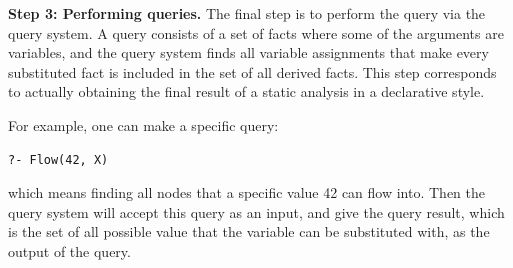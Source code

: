 \smallskip
\textbf{Step 3: Performing queries.}
The final step is to perform the query via the query system.  A query consists
of a set of facts where some of the arguments are variables, and the query system finds all variable
assignments that make every substituted fact is included in the set of all derived facts. This step corresponds
to actually obtaining the final result of a static analysis in a declarative
style. 

For example, one can make a specific query:

\begin{lstlisting}[style=mrule]
?- Flow(42, X)
\end{lstlisting}

which means finding all nodes that a specific value 42 can flow into.
Then the query system will accept this query as an input, and give
the query result, which is the set of all possible value that the variable 
can be substituted with, as the output of the query.

